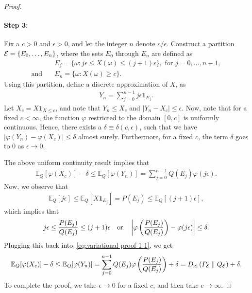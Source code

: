 \begin{proof}
                \paragraph{Step 3:} Fix a $c>0$ and $\epsilon >0$, and let the integer $n$ denote $c/\epsilon$. Construct a partition $\mathcal{E} = \{E_0, \ldots, E_n\}$, where the sets $E_0$ through $E_n$ are defined as  
                \begin{align}
                    &E_j = \{\omega: j\epsilon \leq X(\omega) \leq (j+1)\epsilon \}, \text{ for } j=0, \ldots, n-1, \\
                    \text{and} \quad 
                    &E_n = \{\omega: X(\omega) \geq c\}. 
                \end{align}
                Using this partition, define a discrete approximation of $X$, as 
                \begin{align}
                    Y_n = \sum_{j=0}^{n-1} j \epsilon \boldsymbol{1}_{E_j}. 
                \end{align}
                Let $X_c = X \boldsymbol{1}_{X\leq c}$, and note that $Y_n \leq X_c$ and $|Y_n - X_c| \leq \epsilon$. 
                Now, note that for a fixed $c<\infty$, the function $\varphi$ restricted to the domain $[0,c]$ is uniformly continuous. Hence, there exists a $\delta \equiv \delta(c, \epsilon)$, such that we have $|\varphi(Y_n) - \varphi(X_c)|\leq \delta$ almost surely. Furthermore, for a fixed $c$, the term $\delta$ goes to $0$ as $\epsilon \to 0$. 

                The above uniform continuity result implies that 
                \begin{align}
                    \mathbb{E}_Q[\varphi(X_c)] - \delta \leq \mathbb{E}_Q[\varphi(Y_n)] = \sum_{j=0}^{n-1} Q(E_j) \varphi(j\epsilon).  \label{eq:variational-proof-1-1}
                \end{align}
                Now, we observe that 
                \begin{align}
                    \mathbb{E}_Q[j\epsilon] \leq \mathbb{E}_Q[X \boldsymbol{1}_{E_j}] = P(E_j) \leq \mathbb{E}_Q[ (j+1)\epsilon], 
                \end{align}
                which implies that 
                \begin{align}
                    j \epsilon  \leq \frac{P(E_j)}{Q(E_j)} \leq (j+1)\epsilon  \quad \text{or} \quad 
                    \left \lvert \varphi\left( \frac{P(E_j)}{Q(E_j)} \right) - \varphi(j\epsilon) \right \rvert \leq \delta. 
                \end{align}
                Plugging this back into~\eqref{eq:variational-proof-1-1}, we get 
                \begin{align}
                     \mathbb{E}_Q[\varphi(X_c)] - \delta \leq \mathbb{E}_Q[\varphi(Y_n)] = \sum_{j=0}^{n-1} Q(E_j) \varphi\left( \frac{P(E_j)}{Q(E_j)}\right) + \delta = D_{\text{kl}} \left( P_{\mathcal{E}} \parallel Q_{\mathcal{E}} \right) + \delta.                    
                \end{align}
                To complete the proof, we take $\epsilon \to 0$ for a fixed $c$, and then take $c \to \infty$. 
            \end{proof}

